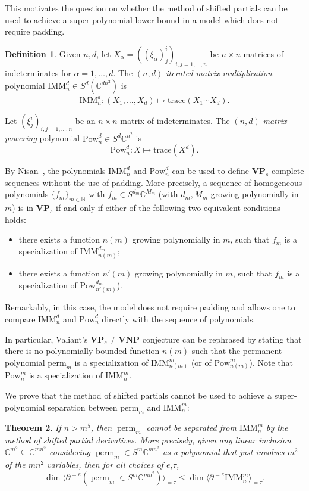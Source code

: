 \documentclass[11pt]{article}
\numberwithin{equation}{section}
\newtheorem{theorem}{Theorem}[section]
\theoremstyle{definition}
\newtheorem{definition}[theorem]{Definition}
\theoremstyle{plain}
\newcommand{\vvirg}{ , \dots , }
\newcommand{\bbC}{\mathbb{C}}
\newcommand{\bbN}{\mathbb{N}}
\newcommand{\bfVNP}{\mathbf{VNP}}
\newcommand{\bfVP}{\mathbf{VP}}
\newcommand{\perm}{\mathrm{perm}}
\newcommand{\Pow}{\mathrm{Pow}}
\newcommand{\trace}{\mathrm{trace}}
\def\BC{\mathbb C}
\def\t{\tau}
\def\tperm{\operatorname{perm}}
\def\tdim{\operatorname{dim}}
\newcommand{\IMM}{\mathrm{IMM}}
\begin{document}
This motivates the question on whether the method of shifted partials can be used to achieve a super-polynomial lower bound in a model which does not require padding.

\begin{definition}
Given $n,d$, let $X_\alpha = ((\xi_\alpha)^i_j)_{i,j = 1 \vvirg n}$ be $n \times n$ matrices of indeterminates for $\alpha = 1 \vvirg d$. The \emph{$(n,d)$-iterated matrix multiplication} polynomial $\IMM^d_n\in S^d(\BC^{dn^2})$ is 
\[
\IMM^d_n: (X_1\vvirg X_d)\mapsto \trace(X_1\cdots X_d).
\] 

Let $(\xi^i_j)_{i,j = 1 \vvirg n}$ be an $n\times n$ matrix of indeterminates. The $(n,d)$-\emph{matrix powering} polynomial $\Pow^d_n\in S^d\BC^{n^2}$ is
\[
 \Pow^d_n : X \mapsto \trace(X^d).
\]
\end{definition}

By %
Nisan~\cite{Nisan:1991:LBN:103418.103462},  %
the polynomials $\IMM^d_n$ and $\Pow^d_n$ can be used to define $\bfVP_s$-complete sequences without the use of padding. More precisely, a sequence of
homogeneous polynomials $\{ f_m \}_{m \in \bbN}$ with
$f_m \in S^{d_m} \bbC^{M_m}$ (with $d_m, M_m$ growing polynomially in $m$)
is in $\bfVP_s$ if and only if
%
%
%
%
%
%
%
%
either of the following two equivalent conditions holds:
\begin{itemize}
  \item there exists a function $n(m)$
%
growing polynomially in $m$, such that $f_m$ is
a specialization of $\IMM^{d_m}_{n(m)}$;
%
  \item there exists a function $n'(m)$
growing polynomially in $m$, such that $f_m$ is
a specialization of $\Pow^{d_m}_{n'(m)}$).
\end{itemize}
%
Remarkably, in this case, the model does not require padding and allows
one to compare $\IMM^d_n$ and $\Pow^d_n$ directly with the sequence of
polynomials.


In particular, Valiant's $\bfVP_s \neq \bfVNP$ conjecture can be rephrased by stating that there is no polynomially bounded function $n(m)$ such that the permanent polynomial $\perm_m$ is a specialization of $\IMM^m_{n(m)}$ (or of $\Pow^m_{n(m)}$). Note that $\Pow^m_n$ is a specialization of $\IMM^m_n$. 

We prove that the method of shifted partials cannot be used to achieve a super-polynomial separation between $\perm_m$ and $\IMM^m_n$: 


\begin{theorem}\label{noshiftthm}
  If $n> m^5$, then $\tperm_m$ cannot be separated from $\IMM^m_{n}$ by the method of shifted partial derivatives. More precisely, given any linear inclusion $\BC^{m^2}\subseteq \BC^{ {m} n^2}$ considering $\tperm_m\in S^m\BC^{ {m} n^2}$ as a polynomial that just involves $m^2$ of the $m n^2$ variables, then for all choices of $e$,$\t$,
  \[
    \tdim  \langle \partial^{=e}(\tperm_m\in S^m\BC^{ {m}n^2})\rangle_{=\t}\leq \tdim  \langle \partial^{=e}\IMM^m_n\rangle_{=\t}.
  \]
\end{theorem} 
\end{document}
